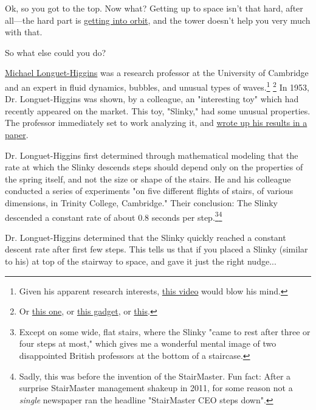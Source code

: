 {{Ok, so you got to the top. Now what? Getting up to space isn't that hard, after all—the hard part is \href{http://what-if.xkcd.com/58/}{getting into orbit}, and the tower doesn't help you very much with that.}

{So what else could you do?}

{ \href{http://noc.ac.uk/about-us/history/national-oceanography-centre-southampton/influential-scientists/professor-michael-s}{Michael Longuet-Higgins} was a research professor at the University of Cambridge and an expert in fluid dynamics, bubbles, and unusual types of waves.{\footnote{Given his apparent research interests, \href{https://www.youtube.com/watch?v=p70s1BNvBXI}{this video} would blow his mind.} } ​{\footnote{Or \href{https://www.youtube.com/watch?v=711bZ\_pLusQ}{this one}, or \href{https://www.kickstarter.com/projects/creatableslabs/project-nesm-never-ending-slinky-machine}{this gadget}, or \href{https://www.youtube.com/watch?v=JwohMl9Toww}{this}.} } In 1953, Dr. Longuet-Higgins was shown, by a colleague, an "interesting toy" which had recently appeared on the market. This toy, "Slinky," had some unusual properties. The professor immediately set to work analyzing it, and \href{http://www2.eng.cam.ac.uk/\~hemh/TV/On\_Slinky\_the\_dynamics\_of\_a\_loose\_heavy\_spring.pdf} {wrote up his results in a paper}.}

{Dr. Longuet-Higgins first determined through mathematical modeling that the rate at which the Slinky descends steps should depend only on the properties of the spring itself, and not the size or shape of the stairs. He and his colleague conducted a series of experiments "on five different flights of stairs, of various dimensions, in Trinity College, Cambridge." Their conclusion: The Slinky descended a constant rate of about 0.8 seconds per step.{\footnote{Except on some wide, flat stairs, where the Slinky "came to rest after three or four steps at most," which gives me a wonderful mental image of two disappointed British professors at the bottom of a staircase.} } ​{\footnote{Sadly, this was before the invention of the StairMaster. Fun fact: After a surprise StairMaster management shakeup in 2011, for some reason not a \emph{single} newspaper ran the headline "StairMaster CEO steps down".

} } }

{Dr. Longuet-Higgins determined that the Slinky quickly reached a constant descent rate after first few steps. This tells us that if you placed a Slinky (similar to his) at top of the stairway to space, and gave it just the right nudge...}

}
